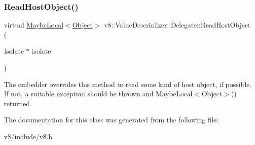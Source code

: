 \subsubsection{\texorpdfstring{Read\+Host\+Object()}{ReadHostObject()}}
{\footnotesize\ttfamily virtual \mbox{\hyperlink{classv8_1_1MaybeLocal}{Maybe\+Local}}$<$\mbox{\hyperlink{classv8_1_1Object}{Object}}$>$ v8\+::\+Value\+Deserializer\+::\+Delegate\+::\+Read\+Host\+Object (\begin{DoxyParamCaption}\item[{Isolate $\ast$}]{isolate }\end{DoxyParamCaption})\hspace{0.3cm}{\ttfamily [virtual]}}

The embedder overrides this method to read some kind of host object, if possible. If not, a suitable exception should be thrown and Maybe\+Local$<$\+Object$>$() returned. 

The documentation for this class was generated from the following file\+:\begin{DoxyCompactItemize}
\item 
v8/include/v8.\+h\end{DoxyCompactItemize}
